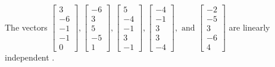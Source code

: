 \begin{exercise}
\begin{exerciseStatement}
  \end{exerciseStatement}
  \begin{exerciseAnswer}
   The vectors \(\left[\begin{array}{r}
3 \\
-6 \\
-1 \\
-1 \\
0
\end{array}\right] , \left[\begin{array}{r}
-6 \\
3 \\
5 \\
-5 \\
1
\end{array}\right] , \left[\begin{array}{r}
5 \\
-4 \\
-1 \\
3 \\
-1
\end{array}\right] , \left[\begin{array}{r}
-4 \\
-1 \\
3 \\
3 \\
-4
\end{array}\right] , \text{ and } \left[\begin{array}{r}
-2 \\
-5 \\
3 \\
-6 \\
4
\end{array}\right]\) are 
  	 linearly independent  .
  


  \end{exerciseAnswer}
\end{exercise}